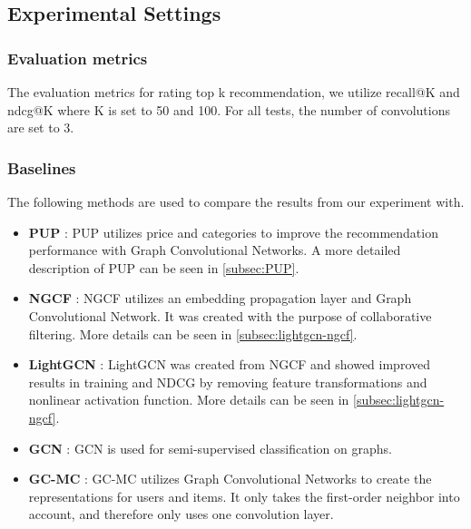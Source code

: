 \subsection{Experimental Settings}
\subsubsection{Evaluation metrics}
The evaluation metrics for rating top k recommendation, we utilize recall@K and ndcg@K where K is set to 50 and 100.
For all tests, the number of convolutions are set to 3.

\subsubsection{Baselines}
The following methods are used to compare the results from our experiment with.
\begin{itemize}
    \item \textbf{PUP} \cite{Priceaware}: PUP utilizes price and categories to improve the recommendation performance with Graph Convolutional Networks. A more detailed description of PUP can be seen in \autoref{subsec:PUP}.
    \item \textbf{NGCF} \cite{NGCF_2019}: NGCF utilizes an embedding propagation layer and Graph Convolutional Network. It was created with the purpose of collaborative filtering. More details can be seen in \autoref{subsec:lightgcn-ngcf}.
    \item \textbf{LightGCN} \cite{lightgcn}: LightGCN was created from NGCF and showed improved results in training and NDCG by removing feature transformations and nonlinear activation function. More details can be seen in \autoref{subsec:lightgcn-ngcf}.
    \item \textbf{GCN} \cite{kipf2017semisupervised}: GCN is used for semi-supervised classification on graphs.
    \item \textbf{GC-MC} \cite{berg2017graph}: GC-MC utilizes Graph Convolutional Networks to create the representations for users and items. It only takes the first-order neighbor into account, and therefore only uses one convolution layer.
\end{itemize}